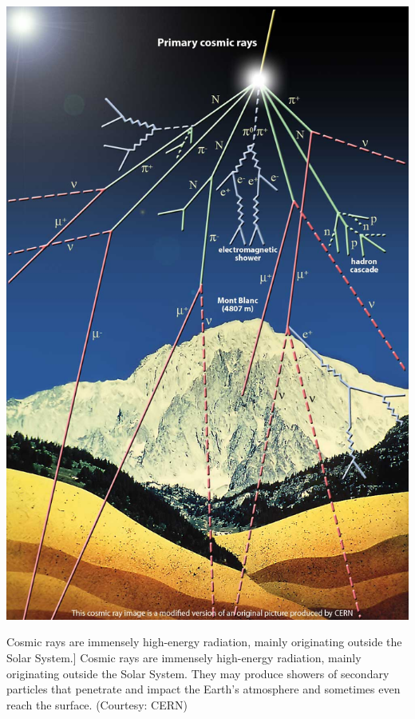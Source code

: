 	\bfi[H]
		\bc
			\includegraphics[width=.9\textwidth]{img/cosmic-rays.jpg}\\[12pt]
			\caption
				[Cosmic rays are immensely high-energy radiation, mainly originating outside the Solar System.]
				{Cosmic rays are immensely high-energy radiation, mainly originating outside the Solar System. They may produce showers of secondary particles that penetrate and impact the Earth's atmosphere and sometimes even reach the surface.	(Courtesy: CERN)}
		\ec
		\label{fig:cosmicrays}
	\efi

	\cleardoublepage

